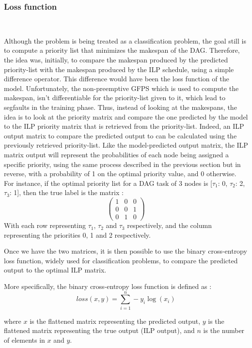 \subsubsection{Loss function}
~
\label{sec:loss_design}

Although the problem is being treated as a classification problem,
the goal still is to compute a priority list that minimizes the makespan
of the DAG.
Therefore, the idea was, initially, to compare the makespan
produced by the predicted priority-list with the makespan
produced by the ILP schedule, using a simple difference operator.
This difference would have been the loss function of the model.
Unfortunately, the non-preemptive GFPS which is used to compute the makespan,
isn't differentiable for the priority-list given to it,
which lead to segfaults in the training phase.
Thus, instead of looking at the makespans,
the idea is to look at the priority matrix 
and compare the one predicted by the model to
the ILP priority matrix that is retrieved from the priority-list.
Indeed, an ILP output matrix to compare the predicted output to
can be calculated using the previously retrieved priority-list.
Like the model-predicted output matrix,
the ILP matrix output will represent the probabilities
of each node being assigned a specific priority, using the 
same process described in the previous section but in reverse, with a probability of 1 
on the optimal priority value, and 0 otherwise. 
For instance, if the optimal priority list for a DAG task of 3 nodes 
is [$\tau_1$: 0, $\tau_2$: 2, $\tau_3$: 1],
then the true label is the matrix :
$$
\begin{pmatrix}
    1 & 0 & 0\\
    0 & 0 & 1\\
    0 & 1 & 0
\end{pmatrix}
$$
With each row representing $\tau_1$, $\tau_2$ and $\tau_3$ respectively,
and the column representing the priorities 0, 1 and 2 respectively.

Once we have the two matrices, 
it is then possible to use the binary cross-entropy loss function,
widely used for classification problems,
to compare the predicted output to the optimal ILP matrix.

More specifically, the binary cross-entropy loss function is defined as :
\begin{equation}
    loss(x, y) = \sum_{i=1}^{n} -y_i\log(x_i)
\end{equation}
    
where $x$ is the flattened matrix representing the predicted output,
$y$ is the flattened matrix representing the true output (ILP output),
and $n$ is the number of elements in $x$ and $y$.


